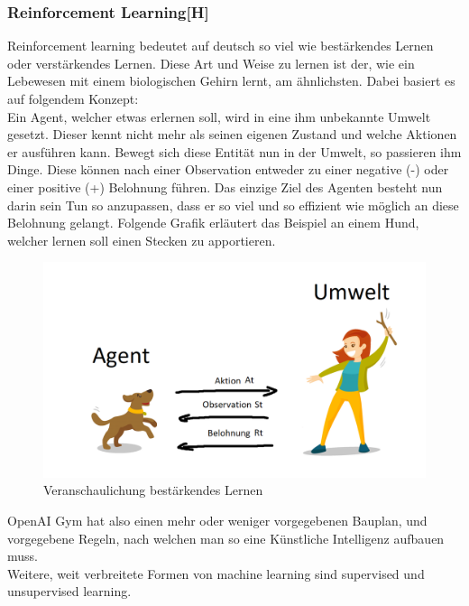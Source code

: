 \subsubsection{Reinforcement Learning[H]}
Reinforcement learning bedeutet auf deutsch so viel wie bestärkendes Lernen oder verstärkendes Lernen.
Diese Art und Weise zu lernen ist der, wie ein Lebewesen mit einem biologischen Gehirn
lernt, am ähnlichsten.
Dabei basiert es auf folgendem Konzept: \\
Ein Agent, welcher etwas erlernen soll, wird in eine ihm unbekannte Umwelt gesetzt. Dieser kennt nicht mehr
als seinen eigenen Zustand und welche Aktionen er ausführen kann. Bewegt sich diese Entität nun in der
Umwelt, so passieren ihm Dinge. Diese können nach einer Observation entweder zu einer negative (-) oder einer
positive (+) Belohnung führen. Das einzige Ziel des Agenten besteht nun darin sein Tun so anzupassen, dass
er so viel und so
effizient wie möglich an diese Belohnung gelangt. Folgende Grafik erläutert das Beispiel an einem Hund,
welcher lernen soll einen Stecken zu apportieren.

\begin{figure}[H]
    \centering
    \includegraphics[scale=0.6]{pics/reinforcementLearningConcept.png}
    \caption{Veranschaulichung bestärkendes Lernen}
    \label{tech:fig:reinfconcept}
\end{figure}

OpenAI Gym hat also einen mehr oder weniger vorgegebenen Bauplan, und vorgegebene Regeln, nach welchen man
so eine Künstliche Intelligenz aufbauen muss. \\
Weitere, weit verbreitete Formen von machine learning sind supervised und unsupervised learning.

